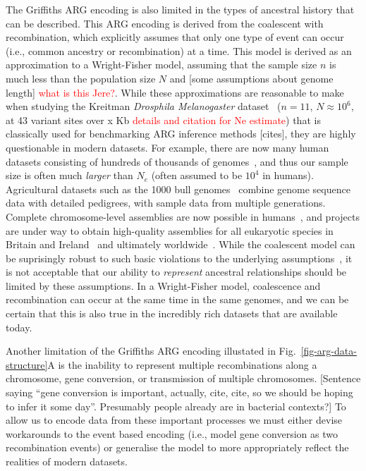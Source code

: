 \documentclass{article}
\begin{document}
The Griffiths ARG encoding is also limited in the types of ancestral
history that can be described. This ARG encoding is derived from the coalescent
with recombination, which explicitly assumes that only one type
of event can occur (i.e., common ancestry or recombination) at a
time. This model is derived as an approximation to a Wright-Fisher
model, assuming that the sample size $n$ is much less than the
population size $N$ and [some assumptions about genome length]
\textcolor{red}{what is this Jere?}. While these approximations are
reasonable
to make when studying the Kreitman \emph{Drosphila Melanogaster}
dataset~\citep{kreitman1983nucleotide} ($n=11$, $N\approx 10^6$,
at 43 variant sites over x Kb \textcolor{red}{details and citation
for Ne estimate}) that is classically used for benchmarking
ARG inference methods [cites],
they are highly questionable in modern datasets. %
For example, there are now many
human datasets consisting of hundreds of thousands of
genomes~\citep{bycroft2018genome,karczewski2020mutational,tanjo2021practical},
and thus our sample size is often much \emph{larger} than $N_e$
(often assumed to be $10^4$ in humans).
Agricultural datasets such as the 1000 bull genomes~\citep{hayes20191000}
combine genome sequence data with detailed pedigrees, with
sample data from multiple generations.
Complete chromosome-level assemblies are now possible
in humans~\citep{miga2020telomere},
and projects are under way to obtain high-quality assemblies
for all eukaryotic species in Britain and Ireland~\citep{darwin2022sequence}
and ultimately worldwide~\citep{lewin2022earth}.
While the coalescent model can be suprisingly robust to such
basic violations to the underlying assumptions~\citep{
wakeley2012gene,bhaskar2014distortion,nelson2020accounting},
it is not acceptable that our ability to \emph{represent}
ancestral relationships should be limited by these assumptions.
In a Wright-Fisher model, coalescence and recombination can
occur at the same time in the same genomes, and we can be
certain that this is also true in the incredibly rich
datasets that are available today.

Another limitation of the Griffiths ARG encoding illustated in
Fig.~\ref{fig-arg-data-structure}A is the inability to represent
multiple recombinations along a chromosome, gene conversion,
or transmission of multiple chromosomes.
[Sentence saying ``gene conversion is important, actually, cite, cite,
so we should be hoping to infer it some day''. Presumably people
already are in bacterial contexts?]
To allow us to encode data from these important processes we
must either devise workarounds to the event based encoding
(i.e., model gene conversion as two recombination events) or
generalise the model to more appropriately reflect the realities
of modern datasets.
\end{document}
